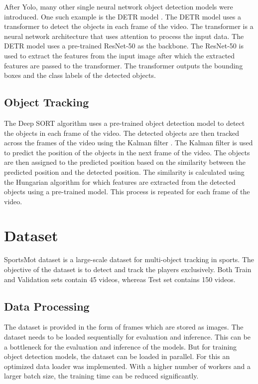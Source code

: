 \documentclass[runningheads]{llncs}
\begin{document}
After Yolo, many other single neural network object detection models were introduced.
One such example is the DETR model \cite{detr2020}.
The DETR model uses a transformer \cite{transformer2017} to detect the objects in each frame of the video.
The transformer is a neural network architecture that uses attention to process the input data.
The DETR model uses a pre-trained ResNet-50 \cite{resnet2015} as the backbone.
The ResNet-50 is used to extract the features from the input image after which the extracted features are passed to the transformer.
The transformer outputs the bounding boxes and the class labels of the detected objects.


\subsection{Object Tracking}
The Deep SORT algorithm uses a pre-trained object detection model to detect the objects in each frame of the video.
The detected objects are then tracked across the frames of the video using the Kalman filter \cite{kalman1960new}.
The Kalman filter is used to predict the position of the objects in the next frame of the video.
The objects are then assigned to the predicted position based on the similarity between the predicted position and the detected position.
The similarity is calculated using the Hungarian algorithm \cite{hungarian1955} for which features are extracted from the detected objects using a pre-trained model.
This process is repeated for each frame of the video.


\section{Dataset}

SportsMot dataset \cite{cui2023sportsmot} is a large-scale dataset for multi-object tracking in sports.
The objective of the dataset is to detect and track the players exclusively.
Both Train and Validation sets contain 45 videos, whereas Test set contains 150 videos.

\subsection{Data Processing}
The dataset is provided in the form of frames which are stored as images.
The dataset needs to be loaded sequentially for evaluation and inference.
This can be a bottleneck for the evaluation and inference of the models.
But for training object detection models, the dataset can be loaded in parallel.
For this an optimized data loader was implemented.
With a higher number of workers and a larger batch size, the training time can be reduced significantly.
\end{document}
